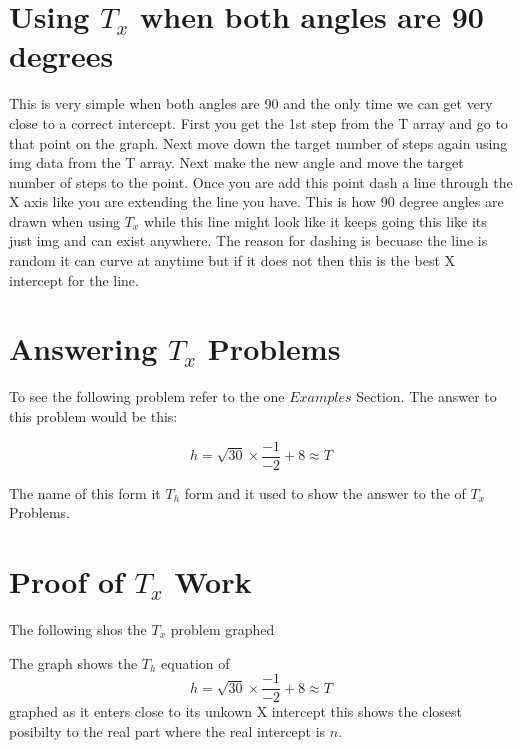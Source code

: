 \documentclass{article}
\begin{document}
 \section{Using \(T_x\) when both angles are 90 degrees}
 This is very simple when both angles are 90 and the only time we can get very close to a correct intercept. First you get the 1st step from the T array and go to that point on the graph. Next move down the target number of steps again using img data from the T array. Next make the new angle and move the target number of steps to the point. Once you are add this point dash a line through the X axis like you are extending the line you have. This is how 90 degree angles are drawn when using \(T_x\) while this line might look like it keeps going this like its just img and can exist anywhere. The reason for dashing is becuase the line is random it can curve at anytime but if it does not then this is the best X intercept for the line.


\section{Answering \(T_x\) Problems}
To see the following problem refer to the one \(Examples\) Section. The answer to this problem would be this:

\[
 h = \sqrt{30} \times \frac{-1}{-2} + 8 \approx T 
\]

The name of this form it \(T_h\) form and it used to show the answer to the of \(T_x\) Problems.


\section{Proof of \(T_x\) Work}
The following shos the \(T_x\) problem graphed 




The graph shows the \(T_h\) equation of 
\[
 h = \sqrt{30} \times \frac{-1}{-2} + 8 \approx T 
\]
 graphed as it enters close to its unkown X intercept this shows the closest posibilty to the real part where the real intercept is \(n\). 
\end{document}
